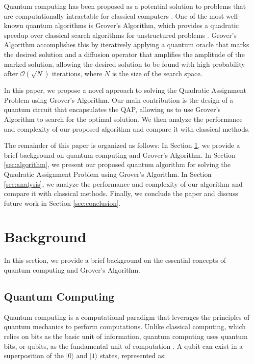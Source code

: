Quantum computing has been proposed as a potential solution to problems that are computationally intractable for classical computers \cite{shor1994algorithms}. One of the most well-known quantum algorithms is Grover's Algorithm, which provides a quadratic speedup over classical search algorithms for unstructured problems \cite{grover1996fast}. Grover's Algorithm accomplishes this by iteratively applying a quantum oracle that marks the desired solution and a diffusion operator that amplifies the amplitude of the marked solution, allowing the desired solution to be found with high probability after $\mathcal{O}(\sqrt{N})$ iterations, where $N$ is the size of the search space.

In this paper, we propose a novel approach to solving the Quadratic Assignment Problem using Grover's Algorithm. Our main contribution is the design of a quantum circuit that encapsulates the QAP, allowing us to use Grover's Algorithm to search for the optimal solution. We then analyze the performance and complexity of our proposed algorithm and compare it with classical methods.

The remainder of this paper is organized as follows: In Section \ref{sec:background}, we provide a brief background on quantum computing and Grover's Algorithm. In Section \ref{sec:algorithm}, we present our proposed quantum algorithm for solving the Quadratic Assignment Problem using Grover's Algorithm. In Section \ref{sec:analysis}, we analyze the performance and complexity of our algorithm and compare it with classical methods. Finally, we conclude the paper and discuss future work in Section \ref{sec:conclusion}.

\section{Background}\label{sec:background}

In this section, we provide a brief background on the essential concepts of quantum computing and Grover's Algorithm.

\subsection{Quantum Computing}

Quantum computing is a computational paradigm that leverages the principles of quantum mechanics to perform computations. Unlike classical computing, which relies on bits as the basic unit of information, quantum computing uses quantum bits, or qubits, as the fundamental unit of computation \cite{nielsen2010quantum}. A qubit can exist in a superposition of the $|0\rangle$ and $|1\rangle$ states, represented as:

